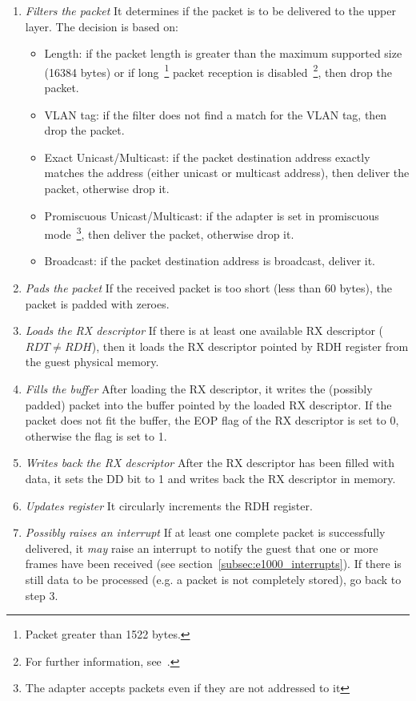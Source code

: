\documentclass[a4paper, 12pt, titlepage]{report}
\begin{document}
\begin{enumerate}
\item \textit{Filters the packet} It determines if the packet is to be delivered to the upper layer. The decision is based on:
	\begin{itemize}
	\item Length: if the packet length is greater than the maximum supported size (16384 bytes) or if long~\footnote{Packet greater than 1522 bytes.} packet reception is disabled~\footnote{For further information, see~\cite{e1000}.}, then drop the packet.
	\item VLAN tag: if the filter does not find a match for the VLAN tag, then drop the packet.
	\item Exact Unicast/Multicast: if the packet destination address exactly matches the address (either unicast or multicast address), then deliver the packet, otherwise drop it.
	\item Promiscuous Unicast/Multicast: if the adapter is set in promiscuous mode~\footnote{The adapter accepts packets even if they are not addressed to it}, then deliver the packet, otherwise drop it.
	\item Broadcast: if the packet destination address is broadcast, deliver it.
	\end{itemize}
\item \textit{Pads the packet} If the received packet is too short (less than 60 bytes), the packet is padded with zeroes.
\item \textit{Loads the RX descriptor} If there is at least one available RX descriptor ($RDT \neq RDH$), then it loads the RX descriptor pointed by RDH register from the guest physical memory.
\item \textit{Fills the buffer} After loading the RX descriptor, it writes the (possibly padded) packet into the buffer pointed by the loaded RX descriptor. If the packet does not fit the buffer, the EOP flag of the RX descriptor is set to 0, otherwise the flag is set to 1.
\item \textit{Writes back the RX descriptor} After the RX descriptor has been filled with data, it sets the DD bit to 1 and writes back the RX descriptor in memory.
\item \textit{Updates register} It circularly increments the RDH register.
\item \textit{Possibly raises an interrupt} If at least one complete packet is successfully delivered, it \textit{may} raise an interrupt to notify the guest that one or more frames have been received (see section~\ref{subsec:e1000_interrupts}). If there is still data to be processed (e.g. a packet is not completely stored), go back to step 3.
\end{enumerate}
\end{document}
